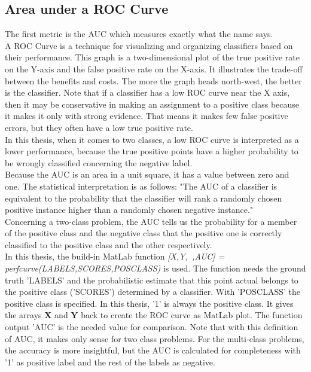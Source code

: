 \subsection{Area under a ROC Curve}
The first metric is the \ac{AUC} which measures exactly what the name says.\cite[p. 13]{Fawcett.}\\
A \ac{ROC} Curve is a technique for visualizing and organizing classifiers based on their performance.
This graph is a two-dimensional plot of the true positive rate on the Y-axis and the false positive rate on the X-axis.
It illustrates the trade-off between the benefits and costs.
The more the graph heads north-west, the better is the classifier.
Note that if a classifier has a low \ac{ROC} curve near the X axis, then it may be conservative in making an assignment to a positive class because it makes it only with strong evidence.
That means it makes few false positive errors, but they often have a low true positive rate.\cite[p. 4]{Fawcett.}\\
In this thesis, when it comes to two classes, a low \acs{ROC} curve is interpreted as a lower performance, because the true positive points have a higher probability to be wrongly classified concerning the
negative label.\\
Because the \ac{AUC} is an area in a unit square, it has a value between zero and one.
The statistical interpretation is as follows: "The \acs{AUC} of a classifier is equivalent to the probability that the classifier will rank a randomly chosen positive instance higher than a randomly chosen negative instance."\cite[p. 13-16]{Fawcett.} \\
Concerning a two-class problem, the \acs{AUC} tells us the probability for a member of the positive class and the negative class that the positive one is correctly classified to the positive class and the other respectively.\\
In this thesis, the build-in MatLab function \textit{[X,Y,~,AUC] = perfcurve(LABELS,SCORES,POSCLASS)} is used.
The function needs the ground truth 'LABELS' and the probabilistic estimate that this point actual belongs to the positive class ('SCORES') determined by a classifier.
With 'POSCLASS' the positive class is specified. In this thesis, '1' is always the positive class.
It gives the arrays $\mathbf{X}$ and $\mathbf{Y}$ back to create the ROC curve as MatLab plot.
The function output 'AUC' is the needed value for comparison.
Note that with this definition of \acs{AUC}, it makes only sense for two class problems.
For the multi-class problems, the accuracy is more insightful, but the \acs{AUC} is calculated for completeness with '1' as positive label and the rest of the labels as negative.\\
